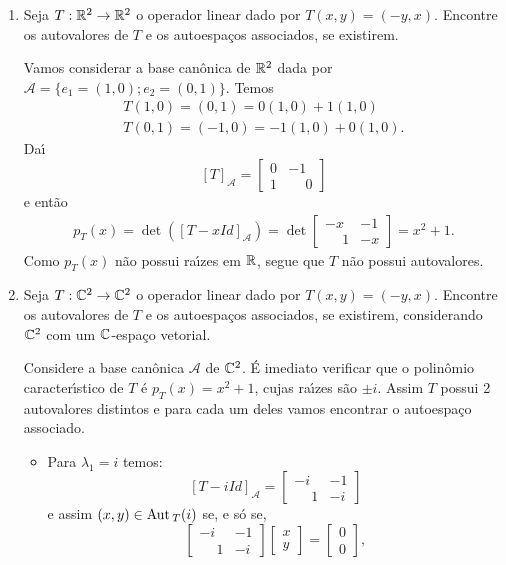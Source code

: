 \begin{exemplo}
	\begin{enumerate}[label={\arabic*})]
		\item Seja $T : \mathbb{R}^2 \to \mathbb{R}^2$ o operador linear dado por $T(x,y) = (-y,x)$. Encontre os autovalores de $T$ e os autoespa\c{c}os associados, se existirem.
		\begin{solucao}
			Vamos considerar a base can\^onica de $\mathbb{R}^2$ dada por $\mathcal{A} = \{e_1 = (1,0); e_2 = (0,1)\}$. Temos
			\begin{align}
				T(1,0) = (0,1) = 0(1,0) + 1(1,0)\\
				T(0,1) = (-1,0) = -1(1,0) + 0(1,0).
			\end{align}
			Da{\'\i}
			\[
				[T]_\mathcal{A} = \begin{bmatrix}0 & -1\\ 1 & \phantom{-}0\end{bmatrix}
			\]
			e ent\~ao
			\begin{align*}
				p_T(x) = \det([T - xId]_\mathcal{A}) = \det\begin{bmatrix} -x & -1\\\phantom{-}1 & -x\end{bmatrix} = x^2 + 1.
			\end{align*}
			Como $p_T(x)$ n\~ao possui ra{\'\i}zes em $\mathbb{R}$, segue que $T$ n\~ao possui autovalores.
		\end{solucao}
		\item Seja $T : \mathbb{C}^2 \to \mathbb{C}^2$ o operador linear dado por $T(x,y) = (-y,x)$. Encontre os autovalores de $T$ e os autoespa\c{c}os associados, se existirem, considerando $\mathbb{C}^2$ com um $\mathbb{C}$-espa\c{c}o vetorial.
		\begin{solucao}
			Considere a base can\^onica $\mathcal{A}$ de $\mathbb{C}^2$. \'E imediato verificar que o polin\^omio caracter{\'\i}stico de $T$ \'e $p_T(x) = x^2 + 1$, cujas ra{\'\i}zes s\~ao $\pm i$. Assim $T$ possui 2 autovalores distintos e para cada um deles vamos encontrar o autoespa\c{c}o associado.
			\begin{itemize}
				\item Para $\lambda_1 = i$ temos:
				\[
					[T - iId]_\mathcal{A} = \begin{bmatrix} -i & -1\\\phantom{-}1 & -i\end{bmatrix}
				\]
				e assim $(x,y) \in {\rm Aut\,}_T(i)$ se, e s\'o se,
				\[
					\begin{bmatrix} -i & -1\\\phantom{-}1 & -i\end{bmatrix} \begin{bmatrix} x\\y\end{bmatrix}	 = \begin{bmatrix} 0\\0\end{bmatrix},
\]
\end{itemize}
\end{solucao}
\end{enumerate}
\end{exemplo}

